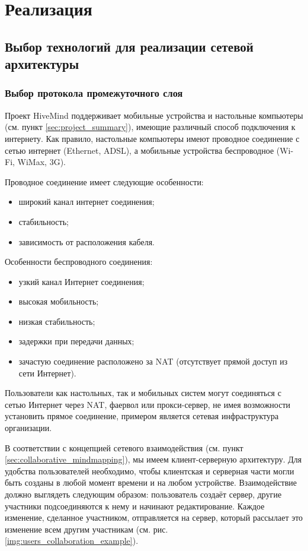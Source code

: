 \newpage

\chapter{Реализация}
\label{ch:chapter_2}

\section{Выбор технологий для реализации сетевой архитектуры}

\subsection{Выбор протокола промежуточного слоя}
\label{sec:choosing_middleware}
Проект HiveMind поддерживает мобильные устройства и настольные компьютеры (см.
пункт \ref{sec:project_summary}), имеющие различный способ подключения к
интернету. Как правило, настольные компьютеры имеют проводное соединение с сетью
интернет (Ethernet, ADSL), а мобильные устройства беспроводное (Wi-Fi, WiMax,
3G).

Проводное соединение имеет следующие особенности:
\begin{itemize}
\item широкий канал интернет соединения;
\item стабильность;
\item зависимость от расположения кабеля.
\end{itemize}

Особенности беспроводного соединения:
\begin{itemize}
\item узкий канал Интернет соединения;
\item высокая мобильность;
\item низкая стабильность;
\item задержки при передачи данных;
\item зачастую соединение расположено за NAT (отсутствует прямой доступ из сети
Интернет).
\end{itemize}

Пользователи как настольных, так и мобильных систем могут соединяться с сетью
Интернет через NAT, фаервол или прокси-сервер, не имея возможности установить
прямое соединение, примером является сетевая инфраструктура организации.

В соответствии с концепцией сетевого взаимодействия (см. пункт
\ref{sec:collaborative_mindmapping}), мы имеем клиент-серверную архитектуру. Для
удобства пользователей необходимо, чтобы клиентская и серверная части могли быть
созданы в любой момент времени и на любом устройстве. Взаимодействие должно
выглядеть следующим образом: пользователь создаёт сервер, другие участники
подсоединяются к нему и начинают редактирование. Каждое изменение, сделанное
участником, отправляется на сервер, который рассылает это изменение всем другим
участникам (см. рис. \ref{img:users_collaboration_example}).

